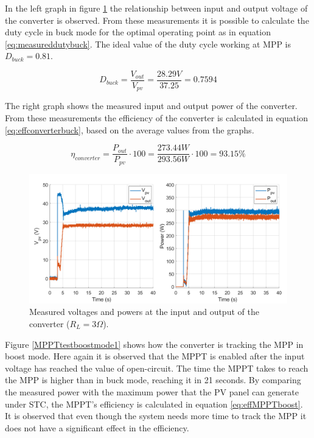 In the left graph in figure \ref{MPPTtestbuckmode2} the relationship between input and output voltage of the converter is observed. From these measurements it is possible to calculate the duty cycle in buck mode for the optimal operating point as in equation \ref{eq:measureddutybuck}. The ideal value of the duty cycle working at MPP is $D_{buck} = 0.81$.

\begin{equation} \label{eq:measureddutybuck}
D_{buck}= \dfrac{V_{out}}{V_{pv}} = \dfrac{28.29V}{37.25} = 0.7594
\end{equation}

The right graph shows the measured input and output power of the converter. From these measurements the efficiency of the converter is calculated in equation \ref{eq:effconverterbuck}, based on the average values from the graphs.

\begin{equation} \label{eq:effconverterbuck}
\eta_{converter}= \dfrac{P_{out}}{P_{pv}} \cdot 100 = \dfrac{273.44W}{293.56W} \cdot 100 = 93.15\% 
\end{equation}


\begin{figure}[H]
	\begin{center}
		\includegraphics[width=1\textwidth]{../Pictures/P1/Test/Buck_mode_MPPT_Vin_Vout_Pin_Pout}
		\caption{Measured voltages and powers at the input and output of the converter ($R_{L}=3\Omega$).}
		\label{MPPTtestbuckmode2}
	\end{center}	
\end{figure}

Figure \ref{MPPTtestboostmode1} shows how the converter is tracking the MPP in boost mode. Here again it is observed that the MPPT is enabled after the input voltage has reached the value of open-circuit. The time the MPPT takes to reach the MPP is higher than in buck mode, reaching it in 21 seconds. By comparing the measured power with the maximum power that the PV panel can generate under STC, the MPPT's efficiency is calculated in equation \ref{eq:effMPPTboost}. It is observed that even though the system needs more time to track the MPP it does not have a significant effect in the efficiency.

